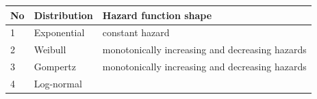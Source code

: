 \documentclass[]{article}
\begin{document}
\begin{longtable}[]{@{}lll@{}}
\toprule
\begin{minipage}[b]{0.04\columnwidth}\raggedright\strut
No\strut
\end{minipage} & \begin{minipage}[b]{0.22\columnwidth}\raggedright\strut
Distribution\strut
\end{minipage} & \begin{minipage}[b]{0.22\columnwidth}\raggedright\strut
Hazard function shape\strut
\end{minipage}\tabularnewline
\midrule
\endhead
\begin{minipage}[t]{0.04\columnwidth}\raggedright\strut
1\strut
\end{minipage} & \begin{minipage}[t]{0.22\columnwidth}\raggedright\strut
Exponential\strut
\end{minipage} & \begin{minipage}[t]{0.22\columnwidth}\raggedright\strut
constant hazard\strut
\end{minipage}\tabularnewline
\begin{minipage}[t]{0.04\columnwidth}\raggedright\strut
2\strut
\end{minipage} & \begin{minipage}[t]{0.22\columnwidth}\raggedright\strut
Weibull\strut
\end{minipage} & \begin{minipage}[t]{0.22\columnwidth}\raggedright\strut
monotonically increasing and decreasing hazards\strut
\end{minipage}\tabularnewline
\begin{minipage}[t]{0.04\columnwidth}\raggedright\strut
3\strut
\end{minipage} & \begin{minipage}[t]{0.22\columnwidth}\raggedright\strut
Gompertz\strut
\end{minipage} & \begin{minipage}[t]{0.22\columnwidth}\raggedright\strut
monotonically increasing and decreasing hazards\strut
\end{minipage}\tabularnewline
\begin{minipage}[t]{0.04\columnwidth}\raggedright\strut
4\strut
\end{minipage} & \begin{minipage}[t]{0.22\columnwidth}\raggedright\strut
Log-normal\strut
\end{minipage} & \begin{minipage}[t]{0.22\columnwidth}\raggedright\strut

\end{minipage}
\end{longtable}
\end{document}

